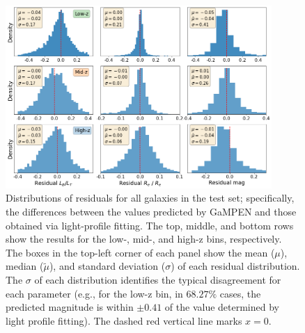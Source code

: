 \documentclass[linenumbers,twocolumn,twocolappendix]{aastex631}
\newcommand\gampen{GaMPEN}
\begin{document}
\begin{CJK*}{UTF8}{gbsn}
\begin{figure}[htb]
    \centering
    \includegraphics[width = 0.9\textwidth]{resi_all_z.png}
    \caption{Distributions of residuals for all galaxies in the test set; specifically, the differences between the values predicted by \gampen{} and those obtained via light-profile fitting. The top, middle, and bottom rows show the results for the low-, mid-, and high-z bins, respectively. The boxes in the top-left corner of each panel show the mean ($\mu$), median ($\tilde{\mu}$), and standard deviation ($\sigma$) of each residual distribution. The $\sigma$ of each distribution identifies the typical disagreement for each parameter (e.g., for the low-z bin, in $68.27\%$ cases, the predicted magnitude is within $\pm0.41$ of the value determined by light profile fitting). The dashed red vertical line marks  $x=0$.}
    \label{fig:resi_all_z}
\end{figure}


\end{CJK*}
\end{document}
